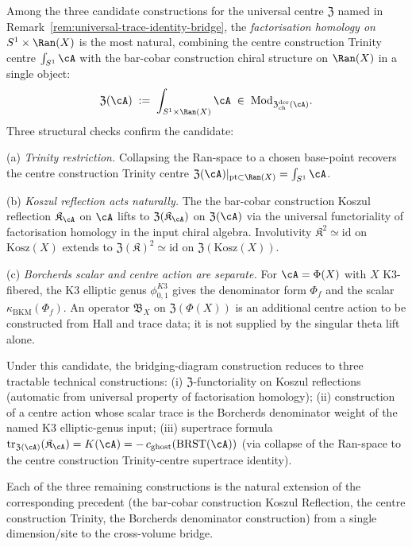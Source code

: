 \begin{remark}
\label{rem:universal-trace-identity-candidate-centre}
Among the three candidate constructions for the universal centre
$\mathfrak{Z}$ named in
Remark~\ref{rem:universal-trace-identity-bridge}, the
\emph{factorisation homology on $S^1 \times \Ran(X)$} is the most natural,
combining the centre construction Trinity centre $\int_{S^1} \cA$ with the bar-cobar construction
chiral structure on $\Ran(X)$ in a single object:
\[
 \mathfrak{Z}(\cA) \;:=\; \int_{S^1 \times \Ran(X)} \cA
 \;\in\; \mathrm{Mod}_{\mathfrak{Z}^{\mathrm{der}}_{\mathrm{ch}}(\cA)}.
\]
Three structural checks confirm the candidate:

\textup{(a)} \emph{Trinity restriction.} Collapsing the Ran-space to a
chosen base-point recovers the centre construction Trinity centre
$\mathfrak{Z}(\cA)|_{\mathrm{pt} \subset \Ran(X)} = \int_{S^1} \cA$.

\textup{(b)} \emph{Koszul reflection acts naturally.} The the bar-cobar construction Koszul
reflection $\mathfrak{K}_\cA$ on $\cA$ lifts to $\mathfrak{Z}(\mathfrak{K}_\cA)$
on $\mathfrak{Z}(\cA)$ via the universal functoriality of factorisation
homology in the input chiral algebra. Involutivity
$\mathfrak{K}^2 \simeq \mathrm{id}$ on $\mathrm{Kosz}(X)$ extends to
$\mathfrak{Z}(\mathfrak{K})^2 \simeq \mathrm{id}$ on $\mathfrak{Z}(\mathrm{Kosz}(X))$.

\textup{(c)} \emph{Borcherds scalar and centre action are separate.} For
\(\cA=\Phi(X)\) with \(X\) K$3$-fibered, the K$3$ elliptic genus
\(\phi^{K3}_{0,1}\) gives the denominator form \(\Phi_f\) and the
scalar \(\kappa_{\mathrm{BKM}}(\Phi_f)\).  An operator
\(\mathfrak B_X\) on \(\mathfrak Z(\Phi(X))\) is an additional centre
action to be constructed from Hall and trace data; it is not supplied
by the singular theta lift alone.

Under this candidate, the bridging-diagram construction reduces to three
tractable technical constructions:
\textup{(i)} $\mathfrak{Z}$-functoriality on Koszul reflections
\textup{(automatic from universal property of factorisation homology);}
\textup{(ii)} construction of a centre action whose scalar trace is the
Borcherds denominator weight of the named K$3$ elliptic-genus input;
\textup{(iii)} supertrace formula
$\mathrm{tr}_{\mathfrak{Z}(\cA)}(\mathfrak{K}_\cA) = K(\cA) = -\,c_{\mathrm{ghost}}(\mathrm{BRST}(\cA))$
\textup{(}via collapse of the Ran-space to the centre construction Trinity-centre
supertrace identity\textup{).}

Each of the three remaining constructions is the natural extension of the
corresponding precedent \textup{(}the bar-cobar construction Koszul Reflection,
the centre construction Trinity, the Borcherds denominator construction\textup{)} from a
single dimension/site to the cross-volume bridge.
\end{remark}

